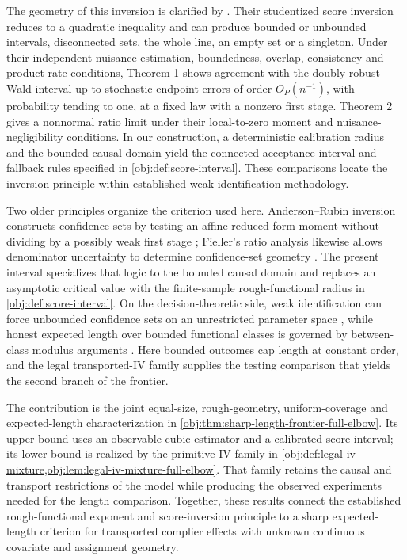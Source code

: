 \documentclass[11pt]{article}
\begin{document}
The geometry of this inversion is clarified by \citet[Section 3 and Theorems 1 and 2]{SmuclerLanniMasip2025Score}. Their studentized score inversion reduces to a quadratic inequality and can produce bounded or unbounded intervals, disconnected sets, the whole line, an empty set or a singleton. Under their independent nuisance estimation, boundedness, overlap, consistency and product-rate conditions, Theorem 1 shows agreement with the doubly robust Wald interval up to stochastic endpoint errors of order \(O_P(n^{-1})\), with probability tending to one, at a fixed law with a nonzero first stage. Theorem 2 gives a nonnormal ratio limit under their local-to-zero moment and nuisance-negligibility conditions. In our construction, a deterministic calibration radius and the bounded causal domain yield the connected acceptance interval and fallback rules specified in \cref{obj:def:score-interval}. These comparisons locate the inversion principle within established weak-identification methodology.

Two older principles organize the criterion used here. Anderson--Rubin inversion constructs confidence sets by testing an affine reduced-form moment without dividing by a possibly weak first stage \citep[pp. 46--63]{Anderson1949}; Fieller's ratio analysis likewise allows denominator uncertainty to determine confidence-set geometry \citep[pp. 175--185]{Fieller1954}. The present interval specializes that logic to the bounded causal domain and replaces an asymptotic critical value with the finite-sample rough-functional radius in \cref{obj:def:score-interval}. On the decision-theoretic side, weak identification can force unbounded confidence sets on an unrestricted parameter space \citep[pp. 1365--1387]{Dufour1997}, while honest expected length over bounded functional classes is governed by between-class modulus arguments \citep[pp. 1805--1840]{CaiLow2004Adaptation}. Here bounded outcomes cap length at constant order, and the legal transported-IV family supplies the testing comparison that yields the second branch of the frontier.

The contribution is the joint equal-size, rough-geometry, uniform-coverage and expected-length characterization in \cref{obj:thm:sharp-length-frontier-full-elbow}. Its upper bound uses an observable cubic estimator and a calibrated score interval; its lower bound is realized by the primitive IV family in \cref{obj:def:legal-iv-mixture,obj:lem:legal-iv-mixture-full-elbow}. That family retains the causal and transport restrictions of the model while producing the observed experiments needed for the length comparison. Together, these results connect the established rough-functional exponent and score-inversion principle to a sharp expected-length criterion for transported complier effects with unknown continuous covariate and assignment geometry.
\end{document}
